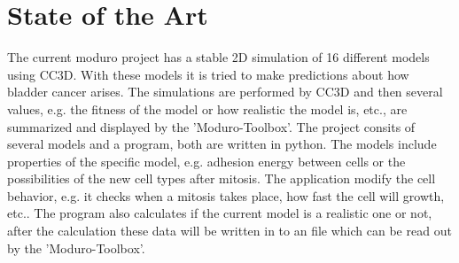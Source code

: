 \chapter{State of the Art}
The current moduro project has a stable 2D simulation of 16 different models using \ac{CC3D}. With these models it is tried to make predictions about how bladder cancer arises. The simulations are performed by \ac{CC3D} and then several values, e.g. the fitness of the model or how realistic the model is, etc., are summarized and displayed by the 'Moduro-Toolbox'. The project consits of several models and a program, both are written in python. The models include properties of the specific model, e.g. adhesion energy between cells or the possibilities of the new cell types after mitosis. The application modify the cell behavior, e.g. it checks when a mitosis takes place, how fast the cell will growth, etc.. The program also calculates if the current model is a realistic one or not, after the calculation these data will be written in to an file which can be read out by the 'Moduro-Toolbox'.

